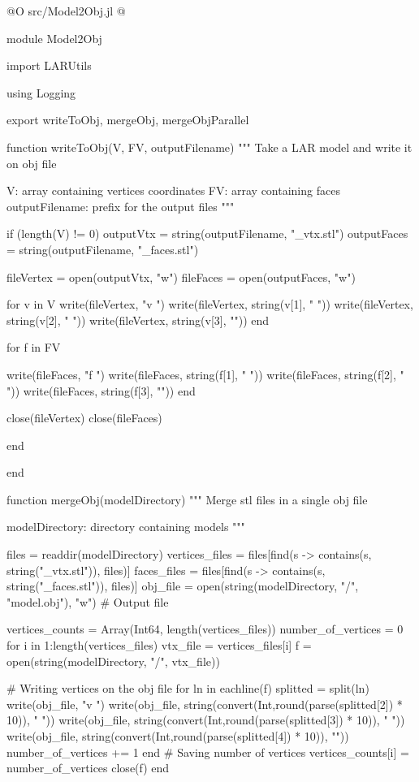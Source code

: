 \documentclass[11pt,oneside]{article}	%
\begin{document}
@O src/Model2Obj.jl
@{module Model2Obj

import LARUtils

using Logging

export writeToObj, mergeObj, mergeObjParallel

function writeToObj(V, FV, outputFilename)
  """
  Take a LAR model and write it on obj file

  V: array containing vertices coordinates
  FV: array containing faces
  outputFilename: prefix for the output files
  """

  if (length(V) != 0)
    outputVtx = string(outputFilename, "_vtx.stl")
    outputFaces = string(outputFilename, "_faces.stl")

    fileVertex = open(outputVtx, "w")
    fileFaces = open(outputFaces, "w")

    for v in V
      write(fileVertex, "v ")
      write(fileVertex, string(v[1], " "))
      write(fileVertex, string(v[2], " "))
      write(fileVertex, string(v[3], "\n"))
    end

    for f in FV

      write(fileFaces, "f ")
      write(fileFaces, string(f[1], " "))
      write(fileFaces, string(f[2], " "))
      write(fileFaces, string(f[3], "\n"))
    end

    close(fileVertex)
    close(fileFaces)

  end

end

function mergeObj(modelDirectory)
  """
  Merge stl files in a single obj file

  modelDirectory: directory containing models
  """

  files = readdir(modelDirectory)
  vertices_files = files[find(s -> contains(s, string("_vtx.stl")), files)]
  faces_files = files[find(s -> contains(s, string("_faces.stl")), files)]
  obj_file = open(string(modelDirectory, "/", "model.obj"), "w") # Output file

  vertices_counts = Array(Int64, length(vertices_files))
  number_of_vertices = 0
  for i in 1:length(vertices_files)
    vtx_file = vertices_files[i]
    f = open(string(modelDirectory, "/", vtx_file))

    # Writing vertices on the obj file
    for ln in eachline(f)
      splitted = split(ln)
      write(obj_file, "v ")
      write(obj_file, string(convert(Int,round(parse(splitted[2]) * 10)), " "))
      write(obj_file, string(convert(Int,round(parse(splitted[3]) * 10)), " "))
      write(obj_file, string(convert(Int,round(parse(splitted[4]) * 10)), "\n"))
      number_of_vertices += 1
    end
    # Saving number of vertices
    vertices_counts[i] = number_of_vertices
    close(f)
  end

}
\end{document}
